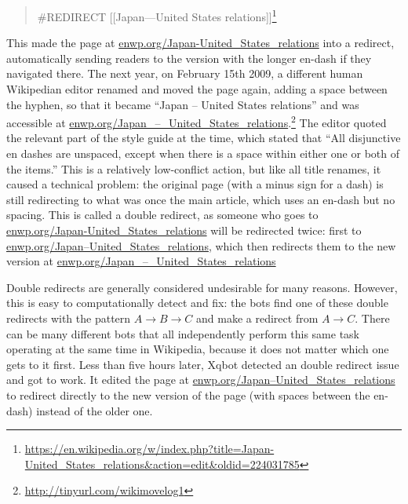 \documentclass[format=acmsmall, review=false, screen=true]{acmart}%
\begin{document}
\begin{quote}
\#REDIRECT [[Japan---United States relations]]\footnote{ \url{https://en.wikipedia.org/w/index.php?title=Japan-United\_States\_relations\&action=edit\&oldid=224031785}}
\end{quote}

This made the page at \url{enwp.org/Japan-United\_States\_relations} into a redirect, automatically sending readers to the version with the longer en-dash if they navigated there. The next year, on February 15th 2009, a different human Wikipedian editor renamed and moved the page again, adding a space between the hyphen, so that it became ``Japan -- United States relations'' and was accessible at \href{http://enwp.org/Japan\_–\_United\_States\_relations}{enwp.org/Japan\_–\_United\_States\_relations}.\footnote{ \url{http://tinyurl.com/wikimovelog1} } The editor quoted the relevant part of the style guide at the time, which stated that ``All disjunctive en dashes are unspaced, except when there is a space within either one or both of the items.'' This is a relatively low-conflict action, but like all title renames, it caused a technical problem: the original page (with a minus sign for a dash) is still redirecting to what was once the main article, which uses an en-dash but no spacing. This is called a double redirect, as someone who goes to \url{enwp.org/Japan-United\_States\_relations} will be redirected twice: first to \href{http://enwp.org/Japan–United\_States\_relations}{enwp.org/Japan–United\_States\_relations}, which then redirects them to the new version at \href{http://enwp.org/Japan\_–\_United\_States\_relations}{enwp.org/Japan\_–\_United\_States\_relations}

Double redirects are generally considered undesirable for many reasons. However, this is easy to computationally detect and fix: the bots find one of these double redirects with the pattern $A \rightarrow B \rightarrow C$ and make a redirect from $A \rightarrow C$. There can be many different bots that all independently perform this same task operating at the same time in Wikipedia, because it does not matter which one gets to it first. Less than five hours later, Xqbot detected an double redirect issue and got to work. It edited the page at \href{http://enwp.org/Japan–United\_States\_relations}{enwp.org/Japan–United\_States\_relations} to redirect directly to the new version of the page (with spaces between the en-dash) instead of the older one.  
\end{document}
